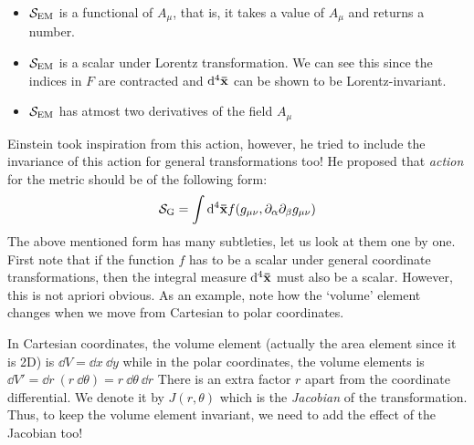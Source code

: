 \begin{itemize}
    \item $\mathcal S_{\mathrm{EM}}$ is a functional of $A_\mu$, that is, it takes a value of $A_\mu$ and returns a number.
    \item $\mathcal S_{\mathrm{EM}}$ is a scalar under Lorentz transformation. We can see this since the indices in $F$ are contracted and $\dd^4\vb{\bar{x}}$ can be shown to be Lorentz-invariant. 
    \item $\mathcal S_{\mathrm{EM}}$ has atmost two derivatives of the field $A_\mu$
\end{itemize}
Einstein took inspiration from this action, however, he tried to include the invariance of this action for general transformations too! He proposed that \textit{action} for the metric should be of the following form:
$$\mathcal S_{\mathrm{G}} = \int \dd^4\vb{\bar{x}} f\qty(g_{\mu\nu}, \partial_\alpha\partial_\beta g_{\mu\nu})$$
The above mentioned form has many subtleties, let us look at them one by one. First note that if the function $f$ has to be a scalar under general coordinate transformations, then the integral measure $\dd^4\vb{\bar{x}}$ must also be a scalar. However, this is not apriori obvious. As an example, note how the `volume' element changes when we move from Cartesian to polar coordinates. 
\begin{figure}[H]
    \centering
    
\end{figure}
\noindent
In Cartesian coordinates, the volume element (actually the area element since it is 2D) is $\dd V = \dd x \ \dd y$ while in the polar coordinates, the volume elements is $\dd V' = \dd r \ (r\ \dd \theta) = r \ \dd \theta \ \dd r$
There is an extra factor $r$ apart from the coordinate differential. We denote it by $J(r,\theta)$ which is the \textit{Jacobian} of the transformation. Thus, to keep the volume element invariant, we need to add the effect of the Jacobian too!
